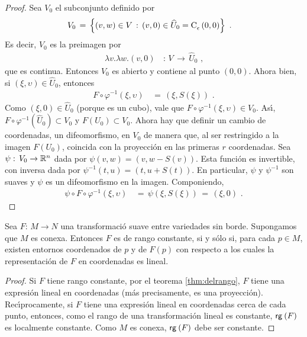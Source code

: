 \begin{proof}
	Sea $V_{0}$ el subconjunto definido por
	\begin{align*}
		V_{0} & \,=\,\left\lbrace (v,w)\in V\,:\,
			(v,0)\in\widehat{U}_{0}=\mathrm{C}^{}_{\epsilon}\left(0,0\right)
			\right\rbrace
		\text{ .}
	\end{align*}
	Es decir, $V_{0}$ es la preimagen por
	\begin{align*}
		\lambda v.\lambda w.(v,0) & \,:\,
			V\,\rightarrow\,\widehat{U}_{0}
		\text{ ,}
	\end{align*}
	que es continua. Entonces $V_{0}$ es abierto y contiene al
	punto $(0,0)$. Ahora bien, si $(\xi,\upsilon)\in\widehat{U}_{0}$,
	entonces
	\begin{align*}
		F\circ\varphi^{-1}(\xi,\upsilon) & \,=\,
			(\xi,S(\xi))
		\text{ .}
	\end{align*}
	Como $(\xi,0)\in\widehat{U}_{0}$ (porque es un cubo), vale que
	$F\circ\varphi^{-1}(\xi,\upsilon)\in V_{0}$. As\'{\i},
	$F\circ\varphi^{-1}(\widehat{U}_{0})\subset V_{0}$ y
	$F(U_{0})\subset V_{0}$. Ahora hay que definir un cambio de
	coordenadas, un difeomorfismo, en $V_{0}$ de manera que, al ser
	restringido a la imagen $F(U_{0})$, coincida con la proyecci\'{o}n
	en las primeras $r$ coordenadas. Sea
	$\psi:\,V_{0}\rightarrow\mathbb{R}^{n}$ dada por
	$\psi(v,w)=(v,w-S(v))$. Esta funci\'{o}n es invertible, con inversa
	dada por $\psi^{-1}(t,u)=(t,u+S(t))$. En particular,
	$\psi$ y $\psi^{-1}$ son suaves y $\psi$ es un difeomorfismo en la
	imagen. Componiendo,
	\begin{align*}
		\psi\circ F\circ\varphi^{-1}(\xi,\upsilon) & \,=\,
			\psi(\xi,S(\xi)) \,=\,(\xi,0)
		\text{ .}
	\end{align*}
\end{proof}

\begin{coroDelRangoLineal}\label{thm:localmentelineal}
	Sea $F:\,M\rightarrow N$ una transformaci\'{o} suave entre variedades
	sin borde. Supongamos que $M$ es conexa. Entonces $F$ es de rango
	constante, si y s\'{o}lo si, para cada $p\in M$, existen entornos
	coordenados de $p$ y de $F(p)$ con respecto a los cuales la
	representaci\'{o}n de $F$ en coordenadas es lineal.
\end{coroDelRangoLineal}

\begin{proof}
	Si $F$ tiene rango constante, por el teorema \ref{thm:delrango},
	$F$ tiene una expresi\'{o}n lineal en coordenadas (m\'{a}s
	precisamente, es una proyecci\'{o}n). Rec\'{\i}procamente, si
	$F$ tiene una expresi\'{o}n lineal en coordenadas cerca de cada
	punto, entonces, como el rango de una transformaci\'{o}n lineal
	es constante, $\mathsf{rg}_{}\left(F\right)$ es localmente constante.
	Como $M$ es conexa, $\mathsf{rg}_{}\left(F\right)$ debe ser constante.
\end{proof}

